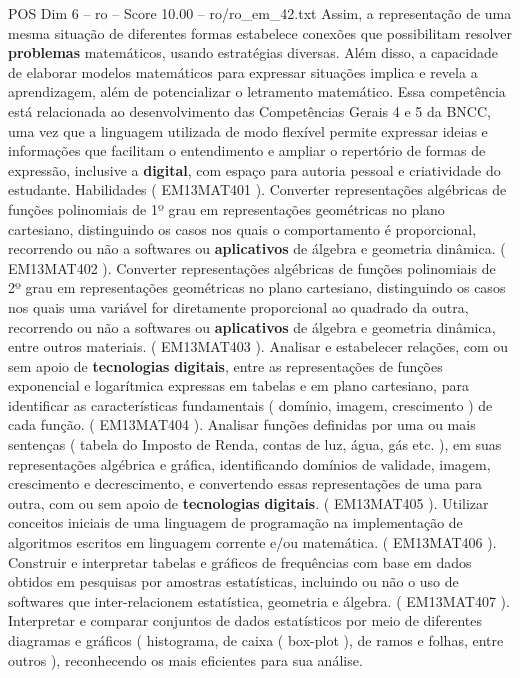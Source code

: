 \begin{textsample}{POS Dim 6 – ro – Score 10.00 – ro/ro\_em\_42.txt}
Assim, a representação de uma mesma situação de diferentes formas estabelece conexões que possibilitam resolver \textbf{problemas} matemáticos, usando estratégias diversas.
Além disso, a capacidade de elaborar modelos matemáticos para expressar situações implica e revela a aprendizagem, além de potencializar o letramento matemático.
Essa competência está relacionada ao desenvolvimento das Competências Gerais 4 e 5 da BNCC, uma vez que a linguagem utilizada de modo flexível permite expressar ideias e informações que facilitam o entendimento e ampliar o repertório de formas de expressão, inclusive a \textbf{digital}, com espaço para autoria pessoal e criatividade do estudante.
Habilidades ( EM13MAT401 ).
Converter representações algébricas de funções polinomiais de 1º grau em representações geométricas no plano cartesiano, distinguindo os casos nos quais o comportamento é proporcional, recorrendo ou não a softwares ou \textbf{aplicativos} de álgebra e geometria dinâmica. ( EM13MAT402 ).
Converter representações algébricas de funções polinomiais de 2º grau em representações geométricas no plano cartesiano, distinguindo os casos nos quais uma variável for diretamente proporcional ao quadrado da outra, recorrendo ou não a softwares ou \textbf{aplicativos} de álgebra e geometria dinâmica, entre outros materiais. ( EM13MAT403 ).
Analisar e estabelecer relações, com ou sem apoio de \textbf{tecnologias} \textbf{digitais}, entre as representações de funções exponencial e logarítmica expressas em tabelas e em plano cartesiano, para identificar as características fundamentais ( domínio, imagem, crescimento ) de cada função. ( EM13MAT404 ).
Analisar funções definidas por uma ou mais sentenças ( tabela do Imposto de Renda, contas de luz, água, gás etc. ), em suas representações algébrica e gráfica, identificando domínios de validade, imagem, crescimento e decrescimento, e convertendo essas representações de uma para outra, com ou sem apoio de \textbf{tecnologias} \textbf{digitais}. ( EM13MAT405 ).
Utilizar conceitos iniciais de uma linguagem de programação na implementação de algoritmos escritos em linguagem corrente e/ou matemática. ( EM13MAT406 ).
Construir e interpretar tabelas e gráficos de frequências com base em dados obtidos em pesquisas por amostras estatísticas, incluindo ou não o uso de softwares que inter-relacionem estatística, geometria e álgebra. ( EM13MAT407 ).
Interpretar e comparar conjuntos de dados estatísticos por meio de diferentes diagramas e gráficos ( histograma, de caixa ( box-plot ), de ramos e folhas, entre outros ), reconhecendo os mais eficientes para sua análise.

\end{textsample}
